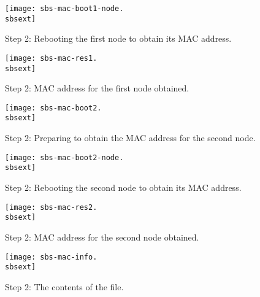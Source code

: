 \begin{figure}[htbp]
  \begin{center}
    \texttt{[image: sbs-mac-boot1-node.\\sbsext]}
    \caption{Step 2: Rebooting the first node to obtain its MAC address.}
    \label{fig:sbs-mac-boot1-node}
  \end{center}
\end{figure}

\begin{figure}[htbp]
  \begin{center}
    \texttt{[image: sbs-mac-res1.\\sbsext]}
    \caption{Step 2: MAC address for the first node obtained.}
    \label{fig:sbs-mac-res1}
  \end{center}
\end{figure}

\begin{figure}[htbp]
  \begin{center}
    \texttt{[image: sbs-mac-boot2.\\sbsext]}
    \caption{Step 2: Preparing to obtain the MAC address for the second node.}
    \label{fig:sbs-mac-boot2}
  \end{center}
\end{figure}

\begin{figure}[htbp]
  \begin{center}
    \texttt{[image: sbs-mac-boot2-node.\\sbsext]}
    \caption{Step 2: Rebooting the second node to obtain its MAC address.}
    \label{fig:sbs-mac-boot2-node}
  \end{center}
\end{figure}

\begin{figure}[htbp]
  \begin{center}
    \texttt{[image: sbs-mac-res2.\\sbsext]}
    \caption{Step 2: MAC address for the second node obtained.}
    \label{fig:sbs-mac-res2}
  \end{center}
\end{figure}

\begin{figure}[htbp]
  \begin{center}
    \texttt{[image: sbs-mac-info.\\sbsext]}
    \caption{Step 2: The contents of the  file.}
    \label{fig:sbs-mac-info}
  \end{center}
\end{figure}

\clearpage
\setlength{\oddsidemargin}{-0.5in}
\setlength{\evensidemargin}{-0.5in}
\setlength{\textwidth}{7.5in}

